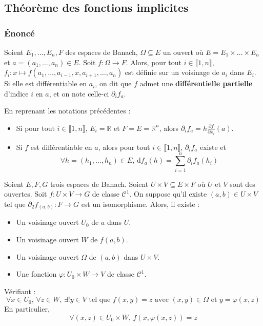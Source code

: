   \subsection{Théorème des fonctions implicites}

  \subsubsection{Énoncé}


  \begin{definition}
    Soient $E_1, \dots, E_n, F$ des espaces de Banach, $\Omega \subseteq E$ un ouvert où $E = E_1 \times \dots \times E_n$ et $a = (a_1, \dots, a_n) \in E$. Soit $f : \Omega \rightarrow F$. Alors, pour tout $i \in \llbracket 1, n \rrbracket$, $f_i : x \mapsto f(a_1, \dots, a_{i-1}, x, a_{i+1}, \dots, a_n)$ est définie sur un voisinage de $a_i$ dans $E_i$. Si elle est différentiable en $a_i$, on dit que $f$ admet une \textbf{différentielle partielle} d'indice $i$ en $a$, et on note celle-ci $\partial_i f_a$.
  \end{definition}

  \begin{remark}
    En reprenant les notations précédentes :
    \begin{itemize}
      \item Si pour tout $i \in \llbracket 1, n \rrbracket$, $E_i = \mathbb{R}$ et $F = E = \mathbb{R}^n$, alors $\partial_i f_a = h \frac{\partial f}{\partial x_i} (a)$.
      \item Si $f$ est différentiable en $a$, alors pour tout $i \in \llbracket 1, n \rrbracket$, $\partial_i f_a$ existe et
      \[ \forall h = (h_1, \dots, h_n) \in E, \, \mathrm{d}f_a(h) = \sum_{i=1}^{n} \partial_i f_a(h_i) \]
    \end{itemize}
  \end{remark}

  \begin{theorem}
    Soient $E, F, G$ trois espaces de Banach. Soient $U \times V \subseteq E \times F$ où $U$ et $V$ sont des ouvertes. Soit $f : U \times V \rightarrow G$ de classe $\mathcal{C}^1$. On suppose qu'il existe $(a,b) \in U \times V$ tel que $\partial_2 f_{(a,b)} : F \rightarrow G$ est un isomorphisme. Alors, il existe :
    \begin{itemize}
      \item Un voisinage ouvert $U_0$ de $a$ dans $U$.
      \item Un voisinage ouvert $W$ de $f(a,b)$.
      \item Un voisinage ouvert $\Omega$ de $(a,b)$ dans $U \times V$.
      \item Une fonction $\varphi : U_0 \times W \rightarrow V$ de classe $\mathcal{C}^1$.
    \end{itemize}
    Vérifiant :
    \[ \forall x \in U_0, \, \forall z \in W, \, \exists! y \in V \text{ tel que } f(x,y)=z \text{ avec } (x, y) \in \Omega \text{ et } y=\varphi(x,z) \]
    En particulier,
    \[ \forall (x,z) \in U_0 \times W, \, f(x, \varphi(x,z)) = z \]
  \end{theorem}

